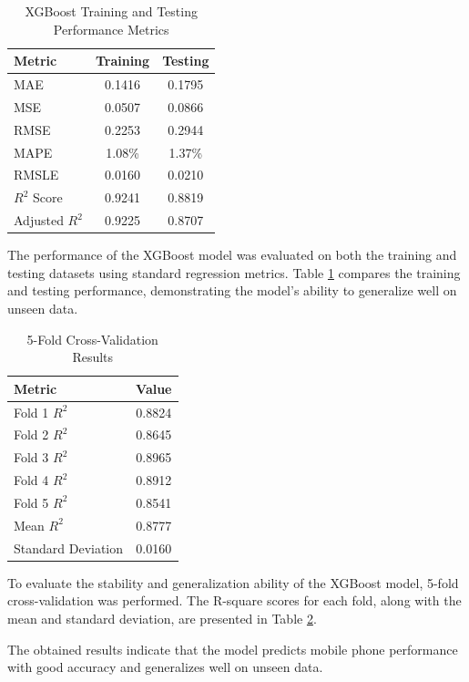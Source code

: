 \documentclass[12pt, a4paper]{report}
\numberwithin{figure}{chapter}
\numberwithin{table}{chapter}
\numberwithin{equation}{chapter}
\begin{document}
\begin{table}[H]
\centering
\caption{XGBoost Training and Testing Performance Metrics}
\label{tab:xgb-performance}
\begin{tabular}{|l|c|c|}
\hline
\textbf{Metric} & \textbf{Training} & \textbf{Testing} \\
\hline
MAE & 0.1416 & 0.1795 \\
\hline
MSE & 0.0507 & 0.0866 \\
\hline
RMSE & 0.2253 & 0.2944 \\
\hline
MAPE & 1.08\% & 1.37\% \\
\hline
RMSLE & 0.0160 & 0.0210 \\
\hline
$R^2$ Score & 0.9241 & 0.8819 \\
\hline
Adjusted $R^2$ & 0.9225 & 0.8707 \\
\hline
\end{tabular}
\end{table}
The performance of the XGBoost model was evaluated on both the training and testing datasets using standard regression metrics. Table \ref{tab:xgb-performance} compares the training and testing performance, demonstrating the model's ability to generalize well on unseen data.
\begin{table}[H]
\centering
\caption{5-Fold Cross-Validation Results}
\label{tab:xgb-cv-results}
\begin{tabular}{|l|c|}
\hline
\textbf{Metric} & \textbf{Value} \\
\hline
Fold 1 $R^2$ & 0.8824 \\
\hline
Fold 2 $R^2$ & 0.8645 \\
\hline
Fold 3 $R^2$ & 0.8965 \\
\hline
Fold 4 $R^2$ & 0.8912 \\
\hline
Fold 5 $R^2$ & 0.8541 \\
\hline
Mean $R^2$ & 0.8777 \\
\hline
Standard Deviation & 0.0160 \\
\hline
\end{tabular}
\end{table}
To evaluate the stability and generalization ability of the XGBoost model, 5-fold cross-validation was performed. The R-square
 scores for each fold, along with the mean and standard deviation, are presented in Table \ref{tab:xgb-cv-results}.

The obtained results indicate that the model predicts mobile phone performance with good accuracy and generalizes well on unseen data.
\end{document}
